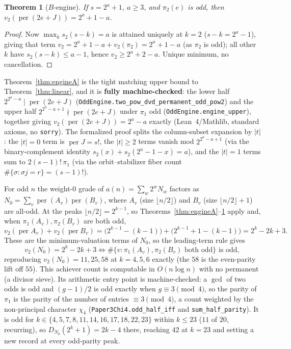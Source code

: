 \documentclass[11pt]{article}
\newtheorem{theorem}{Theorem}
\theoremstyle{remark}\newtheorem{remark}[theorem]{Remark}
\DeclareMathOperator{\perm}{per}
\begin{document}
\begin{theorem}[$B$-engine]\label{thm:engineB}
If $s=2^a+1$, $a\ge3$, and $\pi_2(e)$ is odd, then $v_2(\perm(2e+J))=2^a+1-a$.
\end{theorem}
\begin{proof}
Now $\max_k s_2(s-k)=a$ is attained uniquely at $k=2$ ($s-k=2^a-1$), giving that term
$v_2=2^a+1-a+v_2(\pi_2)=2^a+1-a$ (as $\pi_2$ is odd); all other $k$ have $s_2(s-k)\le a-1$, hence
$v_2\ge2^a+2-a$. Unique minimum, no cancellation.
\end{proof}
Theorem~\ref{thm:engineA} is the tight matching upper bound to Theorem~\ref{thm:linear}, and it is
\textbf{fully machine-checked}: the lower half $2^{2^a-a}\mid\perm(2e+J)$
(\texttt{OddEngine.two\_pow\_dvd\_permanent\_odd\_pow2}) and the upper half
$2^{2^a-a+1}\nmid\perm(2e+J)$ under $\pi_1$ odd (\texttt{OddEngine.engine\_upper}), together giving
$v_2(\perm(2e+J))=2^a-a$ exactly (Lean~4/Mathlib, standard axioms, no \texttt{sorry}). The formalized
proof splits the column-subset expansion by $|t|$: the $|t|{=}0$ term is $\perm J=s!$, the $|t|{\ge}2$
terms vanish mod $2^{2^a-a+1}$ (via the binary-complement identity $s_2(x)+s_2(2^a{-}1{-}x)=a$), and the
$|t|{=}1$ terms sum to $2(s{-}1)!\,\pi_1$ (via the orbit--stabilizer fiber count
$\#\{\sigma:\sigma j=r\}=(s{-}1)!$).

For odd $n$ the weight-$0$ grade of $a(n)=\sum_w2^wN_w$ factors as $N_0=\sum_v\perm(A_v)\perm(B_v)$,
where $A_v$ (size $\lfloor n/2\rfloor$) and $B_v$ (size $\lfloor n/2\rfloor+1$) are all-odd. At the
peaks $\lfloor n/2\rfloor=2^{k-1}$, so Theorems~\ref{thm:engineA}--\ref{thm:engineB} apply and, when
$\pi_1(A_v),\pi_2(B_v)$ are both odd,
\[
   v_2(\perm A_v)+v_2(\perm B_v)=\big(2^{k-1}-(k-1)\big)+\big(2^{k-1}+1-(k-1)\big)=2^k-2k+3 .
\]
These are the minimum-valuation terms of $N_0$, so the leading-term rule gives
\[
   v_2(N_0)=2^k-2k+3\iff\#\{v:\pi_1(A_v),\pi_2(B_v)\text{ both odd}\}\text{ is odd},
\]
reproducing $v_2(N_0)=11,25,58$ at $k=4,5,6$ exactly (the $58$ is the even-parity lift off $55$). This
achiever count is computable in $O(n\log n)$ with no permanent (a divisor sieve). Its arithmetic
entry point is machine-checked: a $\gcd$ of two odds is odd and $(g-1)/2$ is odd exactly when
$g\equiv3\pmod4$, so the parity of $\pi_1$ is the parity of the number of entries $\equiv3\pmod 4$,
a count weighted by the non-principal character $\chi_4$ (\texttt{Paper3Chi4.odd\_half\_iff} and
\texttt{sum\_half\_parity}). It is odd for
$k\in\{4,5,7,8,11,14,16,17,18,22,23\}$ within $k\le23$ ($11$ of $20$, recurring), so
$D_{N_0}(2^k+1)=2k-4$ there, reaching $42$ at $k=23$ and setting a new record at every odd-parity peak.
\end{document}
